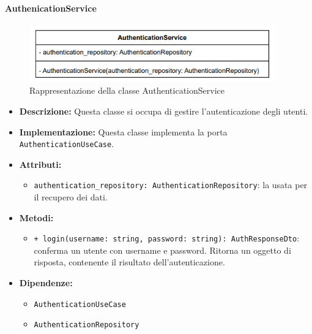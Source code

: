 
\paragraph{AuthenicationService} \label{AuthenticationService}
\begin{figure}[H]
    \centering
    \includegraphics[width=0.95\textwidth]{assets/Backend/authentication_service.png}
    \caption{Rappresentazione della classe AuthenticationService}
  \end{figure}
\begin{itemize}
    \item \textbf{Descrizione:} Questa classe si occupa di gestire l'autenticazione degli utenti.
    \item \textbf{Implementazione:} Questa classe implementa la porta \texttt{AuthenticationUseCase}.
    \item \textbf{Attributi:}
    \begin{itemize}
        \item \texttt{authentication\_repository: AuthenticationRepository}: la  usata per il recupero dei dati.
    \end{itemize}
    \item \textbf{Metodi:}
    \begin{itemize}
        \item \texttt{+ login(username: string, password: string): AuthResponseDto}: conferma un utente con username e password. Ritorna un oggetto di risposta, contenente il risultato dell'autenticazione.
    \end{itemize}
    \item \textbf{Dipendenze:}
    \begin{itemize}
        \item \texttt{AuthenticationUseCase}
        \item \texttt{AuthenticationRepository}
    \end{itemize}
\end{itemize}  

